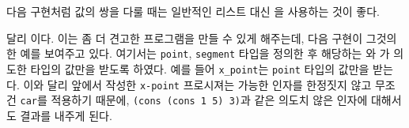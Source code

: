 






다음 구현처럼  값의 쌍을 다룰 때는 일반적인 리스트 대신
을 사용하는 것이 좋다.



 달리   이다. 이는 좀 더 견고한 프로그램을 만들 수 있게 해주는데, 다음
구현이 그것의 한 예를 보여주고 있다. 여기서는 \texttt{point}, \texttt{segment}
타입을 정의한 후 해당하는 와
가 의도한 타입의 값만을 받도록 하였다. 예를 들어
\texttt{x\_point}는 \texttt{point} 타입의 값만을 받는다. 이와 달리
앞에서  작성한 \texttt{x-point} 프로시져는 가능한 인자를 한정짓지
않고 무조건 \texttt{car}를 적용하기 때문에, \texttt{(cons (cons 1 5) 3)}과
같은 의도치 않은 인자에 대해서도 결과를 내주게 된다.







